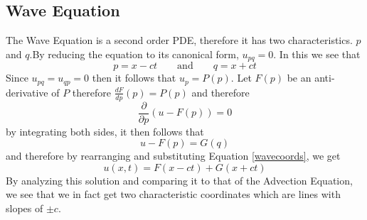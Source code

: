 \subsection{Wave Equation}
The Wave Equation is a second order PDE, therefore it has two characteristics. $p$ and
$q$.By reducing the equation to its canonical form, $u_{pq} = 0$. In this we see that
\begin{equation} \label{wavecoords}
p = x-ct \qquad \text{and} \qquad q = x + ct
\end{equation}
Since $u_{pq} = u_{qp} = 0$ then it follows that $u_p = P(p)$. Let $F(p)$ be an anti-derivative of $P$ therefore $\frac{dF}{dp}(p) = P(p)$ and therefore
\begin{equation}
\frac{\partial}{\partial p}(u - F(p)) = 0
\end{equation}
by integrating both sides, it then follows that
\begin{equation}
u - F(p) = G(q)
\end{equation}
and therefore by rearranging and substituting Equation \ref{wavecoords}, we get
\begin{equation}
u(x,t) = F(x-ct) + G(x+ct)
\end{equation}
By analyzing this solution and comparing it to that of the Advection Equation, we see that we in fact get two characteristic coordinates which are lines with slopes of $\pm c$.
